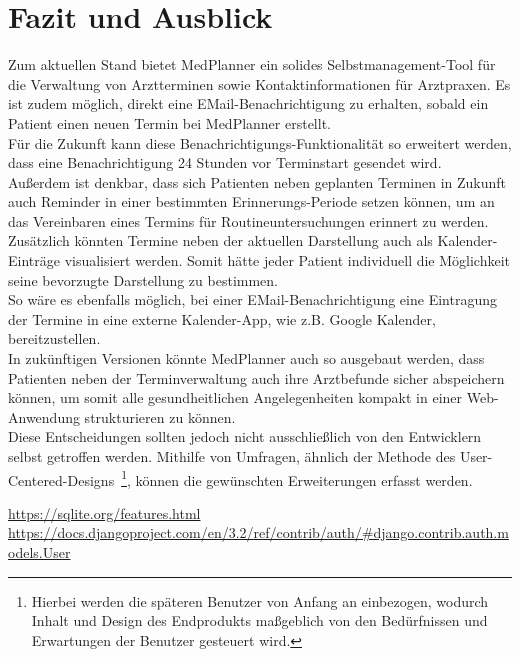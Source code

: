 \documentclass[conference]{IEEEtran}
\begin{document}
\section{Fazit und Ausblick}
Zum aktuellen Stand bietet MedPlanner ein solides Selbstmanagement-Tool für die Verwaltung von Arztterminen sowie Kontaktinformationen für Arztpraxen. Es ist zudem möglich, direkt eine EMail-Benachrichtigung zu erhalten, sobald ein Patient einen neuen Termin bei MedPlanner erstellt.\\
Für die Zukunft kann diese Benachrichtigungs-Funktionalität so erweitert werden, dass eine Benachrichtigung 24 Stunden vor Terminstart gesendet wird.\\
Außerdem ist denkbar, dass sich Patienten neben geplanten Terminen in Zukunft auch Reminder in einer bestimmten Erinnerungs-Periode setzen können, um an das Vereinbaren eines Termins für Routineuntersuchungen erinnert zu werden.\\
Zusätzlich könnten Termine neben der aktuellen Darstellung auch als Kalender-Einträge visualisiert werden. Somit hätte jeder Patient individuell die Möglichkeit seine bevorzugte Darstellung zu bestimmen.\\ 
So wäre es ebenfalls möglich, bei einer EMail-Benachrichtigung eine Eintragung der Termine in eine externe Kalender-App, wie z.B. Google Kalender, bereitzustellen.\\
In zukünftigen Versionen könnte MedPlanner auch so ausgebaut werden, dass Patienten neben der Terminverwaltung auch ihre Arztbefunde sicher abspeichern können, um somit alle gesundheitlichen Angelegenheiten kompakt in einer Web-Anwendung strukturieren zu können.\\
Diese Entscheidungen sollten jedoch nicht ausschließlich von den Entwicklern selbst getroffen werden. Mithilfe von Umfragen, ähnlich der Methode des User-Centered-Designs~\footnote{Hierbei werden die späteren Benutzer von Anfang an einbezogen, wodurch Inhalt und Design des Endprodukts maßgeblich von den Bedürfnissen und Erwartungen der Benutzer gesteuert wird.}, können die gewünschten Erweiterungen erfasst werden.

\begin{thebibliography}{00}
 \url{https://sqlite.org/features.html}
 \url{https://docs.djangoproject.com/en/3.2/ref/contrib/auth/#django.contrib.auth.models.User}
\end{thebibliography}
\end{document}
